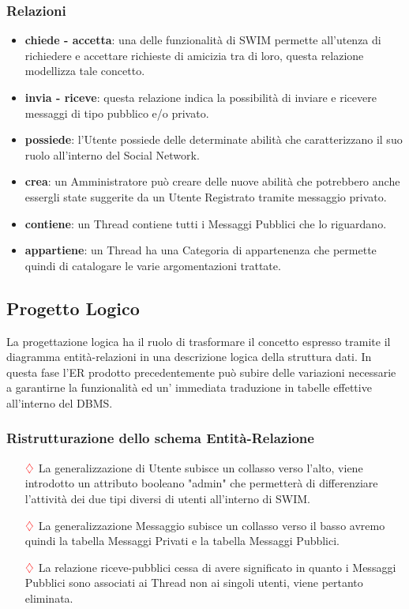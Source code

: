 \subsubsection{Relazioni}
\begin{itemize}
 \item {\bfseries chiede - accetta}: una delle funzionalità di SWIM permette all'utenza di richiedere e accettare richieste di amicizia tra di loro, questa relazione modellizza tale concetto.
 \item {\bfseries invia - riceve}: questa relazione indica la possibilità di inviare e ricevere messaggi di tipo pubblico e/o privato.
 \item {\bfseries possiede}: l'Utente possiede delle determinate abilità che caratterizzano il suo ruolo all'interno del Social Network.
 \item {\bfseries crea}: un Amministratore può creare delle nuove abilità che potrebbero anche essergli state suggerite da un Utente Registrato tramite messaggio privato.
 \item {\bfseries contiene}: un Thread contiene tutti i Messaggi Pubblici che lo riguardano.
 \item {\bfseries appartiene}: un Thread ha una Categoria di appartenenza che permette quindi di catalogare le varie argomentazioni trattate.
\end{itemize}

\subsection{Progetto Logico}

La progettazione logica ha il ruolo di trasformare il concetto espresso tramite il diagramma entità-relazioni in una descrizione logica della struttura dati. In questa fase l'ER prodotto precedentemente può subire delle variazioni necessarie a garantirne la funzionalità ed un' immediata traduzione in tabelle effettive all'interno del DBMS. 

\subsubsection{Ristrutturazione dello schema Entit\`a-Relazione}

\begin{itemize}
 \item[$\textcolor{red}{\diamondsuit}$]  La generalizzazione di Utente subisce un collasso verso l'alto, viene introdotto un attributo booleano "admin" che permetterà di differenziare l'attività dei due tipi diversi di utenti all'interno di SWIM.
 \item[$\textcolor{red}{\diamondsuit}$]  La generalizzazione Messaggio subisce un collasso verso il basso avremo quindi la tabella Messaggi Privati e la tabella Messaggi Pubblici.
\item[$\textcolor{red}{\diamondsuit}$] La relazione riceve-pubblici cessa di avere significato in quanto i Messaggi Pubblici sono associati ai Thread non ai singoli utenti, viene pertanto eliminata.
 \end{itemize}


